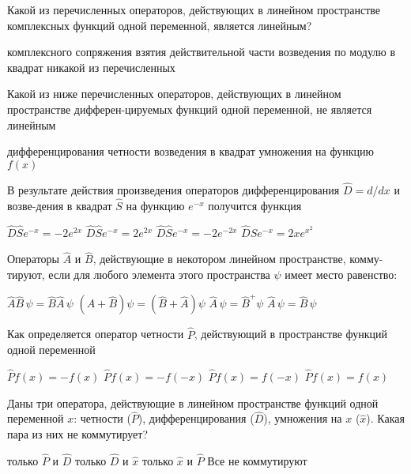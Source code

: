 \documentclass[11pt,a4paper]{exam}
\begin{document}
\begin{questions}
\question Какой из перечисленных операторов, действующих в линейном пространстве комплексных функций одной переменной, является линейным?
\begin{choices}
\choice комплексного сопряжения        
\choice взятия действительной части
\choice возведения по модулю в квадрат    
\choice никакой из перечисленных
\end{choices}

\question Какой из ниже перечисленных операторов, действующих в линейном пространстве дифферен-цируемых функций одной переменной, не является линейным
\begin{choices}
\choice дифференцирования  
\choice четности    
\choice возведения в квадрат  
\choice умножения на функцию $f(x)$
\end{choices}

\question В результате действия произведения операторов дифференцирования $\hat{D}=d/dx$ и возве-дения в квадрат $\hat{S}$ на функцию ${{e}^{-x}}$ получится функция
\begin{choices}
\choice $\hat{D}\hat{S}{{e}^{-x}}=-2{{e}^{2x}}$    
\choice $\hat{D}\hat{S}{{e}^{-x}}=2{{e}^{2x}}$     
\choice $\hat{D}\hat{S}{{e}^{-x}}=-2{{e}^{-2x}}$      
\choice $\hat{D}\hat{S}{{e}^{-x}}=2x{{e}^{{{x}^{2}}}}$
\end{choices}

\question Операторы $\hat{A}$ и $\hat{B}$, действующие в некотором линейном пространстве, комму-тируют, если для любого элемента этого пространства $\psi $ имеет место равенство:
\begin{choices}
\choice $\hat{A}\hat{B}\,\psi =\hat{B}\hat{A}\,\psi $ 
\choice $\left( \hat{A}+\hat{B} \right)\psi =\left( \hat{B}+\hat{A} \right)\psi $      
\choice $\hat{A}\,\psi ={{\hat{B}}^{+}}\psi $         
\choice $\hat{A}\,\psi =\hat{B}\,\psi $
\end{choices}

\question Как определяется оператор четности $\hat{P}$, действующий в пространстве функций одной переменной
\begin{choices}
\choice $\hat{P}f(x)=-f(x)$      
\choice $\hat{P}f(x)=-f(-x)$     
\choice $\hat{P}f(x)=f(-x)$      
\choice $\hat{P}f(x)=f(x)$
\end{choices}

\question Даны три оператора, действующие в линейном пространстве функций одной переменной $x$: четности ($\hat{P}$), дифференцирования ($\hat{D}$), умножения на $x$ ($\hat{x}$). Какая пара из них не коммутирует?
\begin{choices}
\choice только $\hat{P}$ и $\hat{D}$      
\choice только $\hat{D}$ и $\hat{x}$      
\choice только $\hat{x}$ и $\hat{P}$      
\choice Все не коммутируют
\end{choices}


\end{questions}
\end{document}
